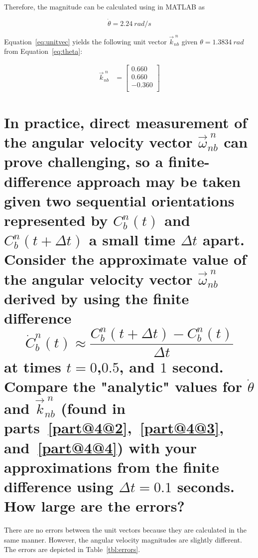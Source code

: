 \begin{parts}
\begin{subparts}
        Therefore, the magnitude can be calculated using  in MATLAB as

        \[\dot{\theta} = 2.24~\unit{rad/s}\]


        \solution
        Equation~\ref{eq:unitvec} yields the following unit vector $\vec{k}^{\;n}_{nb}$ given $\theta = 1.3834~\unit{rad}$ from Equation~\ref{eq:theta}:

        \begin{equation*}
            \begin{split}
                \vec{k}^{\;n}_{nb} & =
                \begin{bmatrix}
                    0.660  \\
                    0.660  \\
                    -0.360 \\
                \end{bmatrix}
            \end{split}
        \end{equation*}

    \end{subparts}

    \part{In practice, direct measurement of the angular velocity vector $\vec{\omega}^{\;n}_{nb}$ can prove challenging, so a finite-difference approach may be taken given two sequential orientations represented by $C^n_b(t)$ and $C^n_b(t + \Delta t)$ a small time $\Delta t$ apart. Consider the approximate value of the angular velocity vector $\vec{\omega}^{\;n}_{nb}$ derived by using the finite difference
        \[\dot{C}^n_b(t) \approx \frac{C^n_b(t + \Delta t) - C^n_b(t)}{\Delta t} \]
        at times $t = 0$,$0.5$, and $1$ second. Compare the "analytic" values for $\dot{\theta}$ and $\vec{k}^{\;n}_{nb}$ (found in parts~\ref{part@4@2},~\ref{part@4@3}, and~\ref{part@4@4}) with your approximations from the finite difference using $\Delta t = 0.1$ seconds. How large are the errors?}

    \solution
    There are no errors between the unit vectors because they are calculated in the same manner. However, the angular velocity magnitudes are slightly different. The errors are depicted in Table~\ref{tbl:errors}.


\end{parts}
